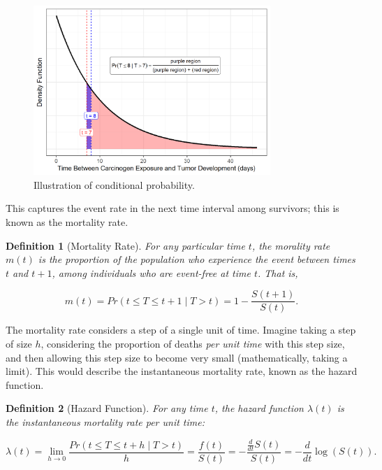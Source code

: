 \documentclass[
]{book}
\theoremstyle{plain}
\theoremstyle{mydefn}
\newtheorem{definition}{Definition}[chapter]
\theoremstyle{myexmpl}
\theoremstyle{remark}
\begin{document}
\begin{figure}

{\centering \includegraphics[width=0.8\textwidth]{./Images/surv-conditional-probability-1} 

}

\caption{Illustration of conditional probability.}\label{fig:surv-conditional-probability}
\end{figure}

This captures the event rate in the next time interval among survivors; this is known as the mortality rate.

\begin{definition}[Mortality Rate]
\protect\hypertarget{def:defn-mortality}{}{\label{def:defn-mortality} {} }For any particular time \(t\), the morality rate \(m(t)\) is the proportion of the population who experience the event between times \(t\) and \(t + 1\), among individuals who are event-free at time \(t\). That is,

\[m(t) = Pr(t \leq T \leq t + 1 \mid T > t) = 1 - \frac{S(t + 1)}{S(t)}.\]
\end{definition}

The mortality rate considers a step of a single unit of time. Imagine taking a step of size \(h\), considering the proportion of deaths \emph{per unit time} with this step size, and then allowing this step size to become very small (mathematically, taking a limit). This would describe the instantaneous mortality rate, known as the hazard function.

\begin{definition}[Hazard Function]
\protect\hypertarget{def:defn-hazard}{}{\label{def:defn-hazard} {} }For any time \(t\), the hazard function \(\lambda(t)\) is the instantaneous mortality rate per unit time:

\[\lambda(t) = \lim_{h \rightarrow 0} \frac{Pr(t \leq T \leq t + h \mid T > t)}{h} = \frac{f(t)}{S(t)} = -  \frac{\frac{d}{dt} S(t)}{S(t)} = -\frac{d}{dt} \log(S(t)).\]
\end{definition}
\end{document}
